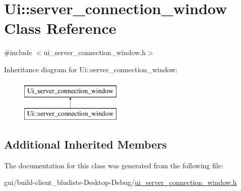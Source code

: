 \hypertarget{classUi_1_1server__connection__window}{\section{Ui\-:\-:server\-\_\-connection\-\_\-window Class Reference}
\label{classUi_1_1server__connection__window}
}


{\ttfamily \#include $<$ui\-\_\-server\-\_\-connection\-\_\-window.\-h$>$}

Inheritance diagram for Ui\-:\-:server\-\_\-connection\-\_\-window\-:\begin{figure}[H]
\begin{center}
\leavevmode
\includegraphics[height=2.000000cm]{classUi_1_1server__connection__window}
\end{center}
\end{figure}
\subsection*{Additional Inherited Members}


The documentation for this class was generated from the following file\-:\begin{DoxyCompactItemize}
\item 
gui/build-\/client\-\_\-bludiste-\/\-Desktop-\/\-Debug/\hyperlink{ui__server__connection__window_8h}{ui\-\_\-server\-\_\-connection\-\_\-window.\-h}\end{DoxyCompactItemize}
